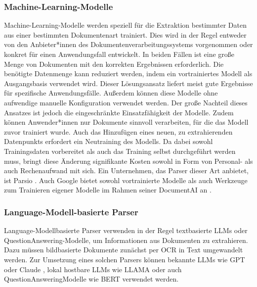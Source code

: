 \subsubsection{Machine-Learning-Modelle}
\label{subsubsec:vortrainierte-Modelle}

Machine-Learning-Modelle werden speziell für die Extraktion bestimmter Daten aus einer bestimmten Dokumentenart trainiert. Dies wird in der Regel entweder von den Anbieter*innen des Dokumentenverarbeitungssystems vorgenommen oder konkret für einen Anwendungsfall entwickelt. In beiden Fällen ist eine große Menge von Dokumenten mit den korrekten Ergebnissen erforderlich. Die benötigte Datenmenge kann reduziert werden, indem ein vortrainiertes Modell als Ausgangsbasis verwendet wird. Dieser Lösungsansatz liefert meist gute Ergebnisse für spezifische Anwendungsfälle. Außerdem können diese Modelle ohne aufwendige manuelle Konfiguration verwendet werden. Der große Nachteil dieses Ansatzes ist jedoch die eingeschränkte Einsatzfähigkeit der Modelle. Zudem können Anwender*innen nur Dokumente sinnvoll verarbeiten, für die das Modell zuvor trainiert wurde. Auch das Hinzufügen eines neuen, zu extrahierenden Datenpunkts erfordert ein Neutraining des Modells. Da dabei sowohl Trainingsdaten vorbereitet als auch das Training selbst durchgeführt werden muss, bringt diese Änderung signifikante Kosten sowohl in Form von Personal- als auch Rechenaufwand mit sich. Ein Unternehmen, das Parser dieser Art anbietet, ist Parsio \cite{parsio_pdf_extraction}. Auch Google bietet sowohl vortrainierte Modelle als auch Werkzeuge zum Trainieren eigener Modelle im Rahmen seiner DocumentAI an \cite{google_documentAI}.

\subsubsection{Language-Modell-basierte Parser}
\label{subsubsec:llm-basierte-modelle}

Language-Modell\-basierte Parser verwenden in der Regel textbasierte \glspl{LLM} oder Question\-Answering-Modelle, um Informationen aus Dokumenten zu extrahieren. Dazu müssen bildbasierte Dokumente zunächst per \gls{OCR} in Text umgewandelt werden. Zur Umsetzung eines solchen Parsers können bekannte \glspl{LLM} wie GPT \cite{BrownTomB2020LMaF, openai_chatgpt} oder Claude \cite{anthropic_claude}, lokal hostbare \glspl{LLM} wie LLAMA \cite{TouvronHugo2023LOaE} oder auch Question\-Answering\-Modelle wie BERT \cite{DevlinJacob2019BPoD} verwendet werden.

